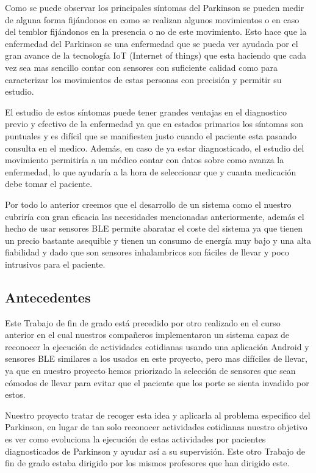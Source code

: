 \documentclass[11pt,spanish]{article}
\begin{document}
Como se puede observar los principales síntomas del Parkinson se pueden medir de alguna forma fijándonos en como se realizan algunos movimientos o en caso del temblor fijándonos en la presencia o no de este movimiento. Esto hace que la enfermedad del Parkinson se una enfermedad que se pueda ver ayudada por el gran avance de la tecnología IoT (Internet of things) que esta haciendo que cada vez sea mas sencillo contar con sensores con suficiente calidad como para caracterizar los movimientos de estas personas con precisión y permitir su estudio.
\newline

El estudio de estos síntomas puede tener grandes ventajas en el diagnostico previo y efectivo de la enfermedad ya que en estados primarios los síntomas son puntuales y es difícil que se manifiesten justo cuando el paciente esta pasando consulta en el medico. Además, en caso de ya estar diagnosticado, el estudio del movimiento permitiría a un médico contar con datos sobre como avanza la enfermedad, lo que ayudaría a la hora de seleccionar que y cuanta medicación debe tomar el paciente.
\newline

Por todo lo anterior creemos que el desarrollo de un sistema como el nuestro cubriría con gran eficacia las necesidades mencionadas anteriormente, además el hecho de usar sensores BLE permite abaratar el coste del sistema ya que tienen un precio bastante asequible y tienen un consumo de energía muy bajo y una alta fiabilidad y dado que son sensores inhalambricos son fáciles de llevar y poco intrusivos para el paciente.

\subsection{Antecedentes}

Este Trabajo de fin de grado está precedido por otro realizado en el curso anterior \cite{TFG_Anterior}  en el cual nuestros compañeros implementaron un sistema capaz de reconocer la ejecución de actividades cotidianas usando una aplicación Android y sensores BLE similares a los usados en este proyecto, pero mas difíciles de llevar, ya que en nuestro proyecto hemos priorizado la selección de sensores que sean cómodos de llevar para evitar que el paciente que los porte se sienta invadido por estos. 
\newline

Nuestro proyecto tratar de recoger esta idea y aplicarla al problema especifico del Parkinson, en lugar de tan solo reconocer actividades cotidianas nuestro objetivo es ver como evoluciona la ejecución de estas actividades por pacientes diagnosticados de Parkinson y ayudar así a su supervisión. Este otro Trabajo de fin de grado estaba dirigido por los mismos profesores que han dirigido este.
\newline
\end{document}
